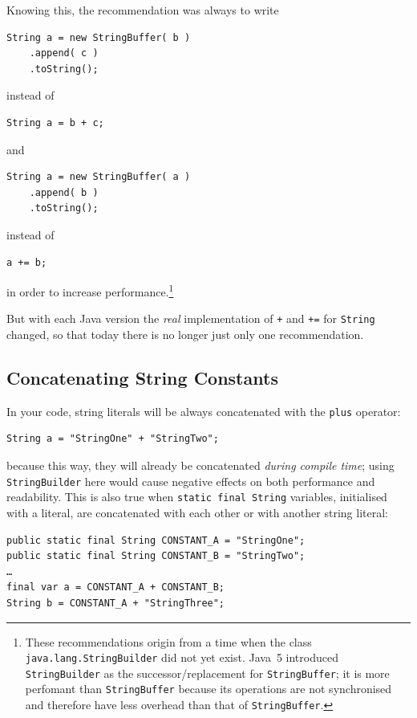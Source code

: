 Knowing this, the recommendation was always to write
\begin{lstlisting}
String a = new StringBuffer( b )
    .append( c )
    .toString();
\end{lstlisting}
instead of
\begin{lstlisting}
String a = b + c;
\end{lstlisting}
and
\begin{lstlisting}
String a = new StringBuffer( a )
    .append( b )
    .toString();
\end{lstlisting}
instead of
\begin{lstlisting}
a += b;
\end{lstlisting}
in order to increase performance.\footnote{These recommendations origin from a time when the class \lstinline|java.lang.StringBuilder|\autocite{ORACLE_DOC_STRINGBUILDER_CLASS} did not yet exist. Java~5 introduced \lstinline|StringBuilder| as the successor/replacement for \lstinline|StringBuffer|; it is more perfomant than \lstinline|StringBuffer| because its operations are not synchronised and therefore have less overhead than that of \lstinline|StringBuffer|.}

But with each Java version the \textit{real} implementation of \lstinline|+| and \lstinline|+=| for \lstinline|String| changed, so that today there is no longer just only one recommendation.


\subsection{Concatenating String Constants}
In your code, string literals will be always concatenated with the \verb#plus# operator:
\begin{lstlisting}
String a = "StringOne" + "StringTwo";
\end{lstlisting}
because this way, they will already be concatenated \textit{during compile time}; using \lstinline|StringBuilder| here would cause negative effects on both performance and readability. This is also true when \lstinline|static final String| variables, initialised with a literal, are concatenated with each other or with another string literal:
\begin{lstlisting}
public static final String CONSTANT_A = "StringOne";
public static final String CONSTANT_B = "StringTwo";
…
final var a = CONSTANT_A + CONSTANT_B;
String b = CONSTANT_A + "StringThree";
\end{lstlisting}

